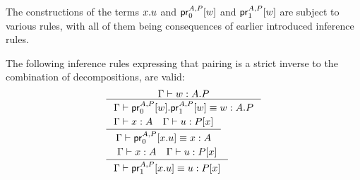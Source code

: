 The constructions of the terms $\tmext{A}{P}{x}{u}$ and $\cprojfst{A}{P}{w}$ and
$\cprojsnd{A}{P}{w}$ are subject to various rules, with all of them being
consequences of earlier introduced inference rules.

\begin{lem} The following inference rules expressing that pairing is a strict
inverse to the combination of decompositions, are valid:
\begin{align*}
& \inference
    {\jterm{\Gamma}{\ctxext{A}{P}}{w}}
    {\jtermeq
      {\Gamma}
      {\ctxext{A}{P}}
      {\tmext{A}{P}{\cprojfst{A}{P}{w}}{\cprojsnd{A}{P}{w}}}
      {w}}\\
& \inference
  {\jterm{\Gamma}{A}{x}
   \jterm{\Gamma}{\subst{x}{P}}{u}}
  {\jtermeq{\Gamma}{A}{\cprojfst{A}{P}{\tmext{A}{P}{x}{u}}}{x}}\\
& \inference
  {\jterm{\Gamma}{A}{x}
   \jterm{\Gamma}{\subst{x}{P}}{u}}
  {\jtermeq{\Gamma}{\subst{x}{P}}{\cprojsnd{A}{P}{\tmext{A}{P}{x}{u}}}{u}}
\end{align*}
\end{lem}

